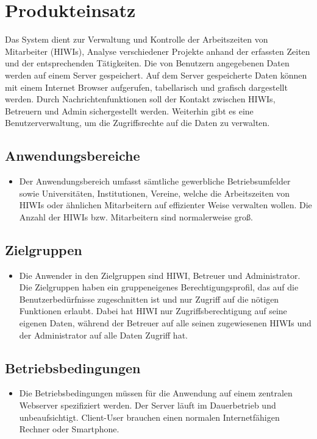 \section{Produkteinsatz}
Das System dient zur Verwaltung und Kontrolle der Arbeitszeiten von Mitarbeiter (HIWIs), Analyse verschiedener Projekte anhand der erfassten Zeiten und der entsprechenden Tätigkeiten. Die von Benutzern angegebenen Daten werden auf einem Server gespeichert. Auf dem Server gespeicherte Daten können mit einem Internet Browser aufgerufen, tabellarisch und grafisch dargestellt werden. Durch Nachrichtenfunktionen soll der Kontakt zwischen HIWIs, Betreuern und Admin sichergestellt werden. Weiterhin gibt es eine Benutzerverwaltung, um die Zugriffsrechte auf die Daten zu verwalten.
\subsection{Anwendungsbereiche}
\begin{itemize}
	\item Der Anwendungsbereich umfasst sämtliche gewerbliche Betriebsumfelder sowie Universitäten, Institutionen, Vereine, welche die Arbeitszeiten von HIWIs oder ähnlichen Mitarbeitern auf effizienter Weise verwalten wollen. Die Anzahl der HIWIs bzw. Mitarbeitern sind normalerweise groß. 
\end{itemize}

\subsection{Zielgruppen}
\begin{itemize}
	\item Die Anwender in den Zielgruppen sind HIWI, Betreuer und Administrator. Die Zielgruppen haben ein gruppeneigenes Berechtigungsprofil, das auf die Benutzerbedürfnisse zugeschnitten ist und nur Zugriff auf die nötigen Funktionen erlaubt. Dabei hat HIWI nur Zugriffsberechtigung auf seine eigenen Daten, während der Betreuer auf alle seinen zugewiesenen HIWIs und der Administrator auf alle Daten Zugriff hat.
\end{itemize}

\subsection{Betriebsbedingungen}
\begin{itemize}
	\item Die Betriebsbedingungen müssen für die Anwendung auf einem zentralen Webserver spezifiziert werden. Der Server läuft im Dauerbetrieb und unbeaufsichtigt. Client-User brauchen einen normalen Internetfähigen Rechner oder Smartphone.
\end{itemize}